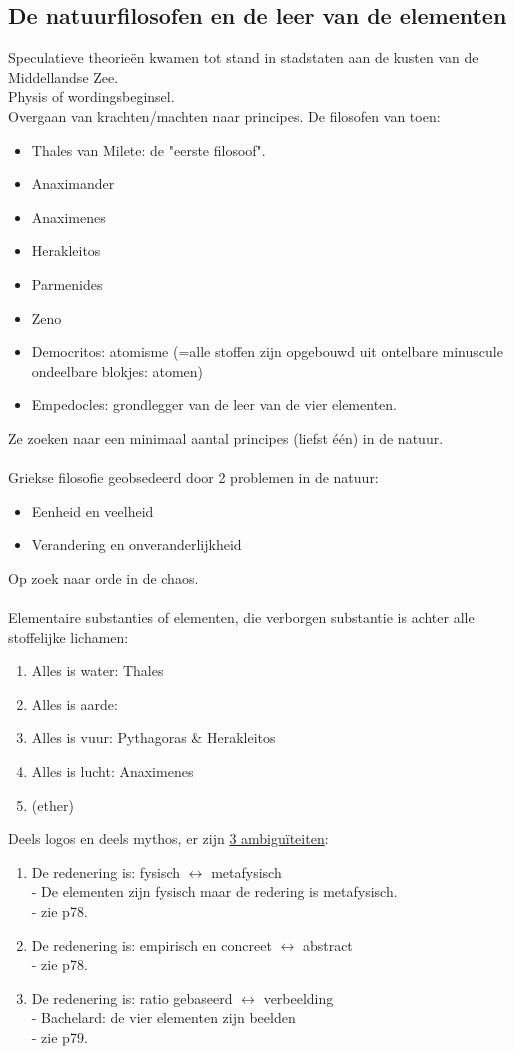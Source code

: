 \documentclass[11pt,a4paper]{article}
\begin{document}
\subsection{De natuurfilosofen en de leer van de elementen}
Speculatieve theorie\"en kwamen tot stand in stadstaten aan de kusten van de Middellandse Zee.
\\
Physis of wordingsbeginsel.
\\Overgaan van krachten/machten naar principes.
De filosofen van toen:
\begin{itemize}
\item Thales van Milete: de "eerste filosoof".
\item Anaximander
\item Anaximenes
\item Herakleitos
\item Parmenides
\item Zeno
\item Democritos: atomisme (=alle stoffen zijn opgebouwd uit ontelbare minuscule ondeelbare blokjes: atomen)
\item Empedocles: grondlegger van de leer van de vier elementen.
\end{itemize}
Ze zoeken naar een minimaal aantal principes (liefst \'e\'en) in de natuur.
\\
\\
Griekse filosofie geobsedeerd door 2 problemen in de natuur:
\begin{itemize}
\item Eenheid en veelheid
\item Verandering en onveranderlijkheid
\end{itemize}
Op zoek naar orde in de chaos.
\\
\\
Elementaire substanties of elementen, die verborgen substantie is achter alle stoffelijke lichamen:
\begin{enumerate}
\item Alles is water: Thales
\item Alles is aarde:
\item Alles is vuur: Pythagoras \& Herakleitos
\item Alles is lucht: Anaximenes
\item (ether)
\end{enumerate}
Deels logos en deels mythos, er zijn \underline{3 ambigu\"iteiten}:
\begin{enumerate}
\item De redenering is: fysisch $\leftrightarrow$ metafysisch
\\-  De elementen zijn fysisch maar de redering is metafysisch.
\\- zie p78.
\item De redenering is: empirisch en concreet $\leftrightarrow$ abstract
\\- zie p78.
\item De redenering is: ratio gebaseerd $\leftrightarrow$ verbeelding
\\- Bachelard: de vier elementen zijn beelden
\\- zie p79.
\end{enumerate}
\end{document}
